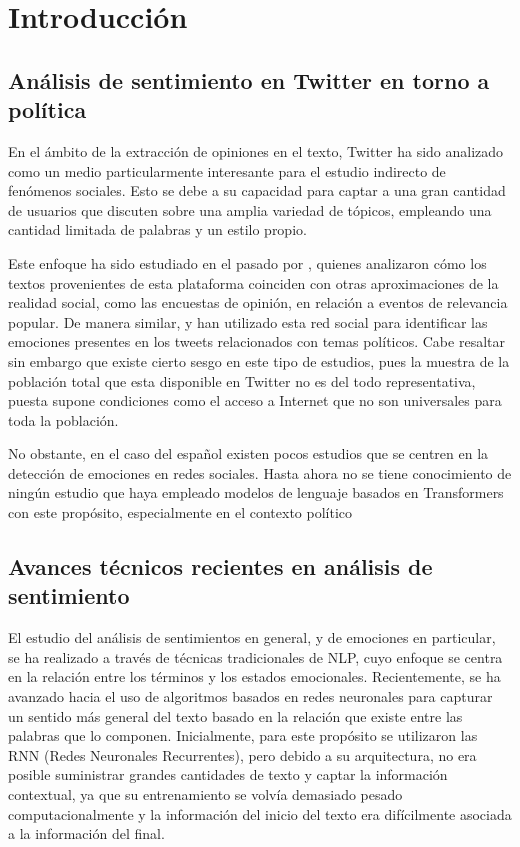 \chapter{Introducción}

\section{Análisis de sentimiento en Twitter en torno a política}


En el ámbito de la extracción de opiniones en el texto, Twitter ha sido analizado como un medio particularmente interesante para el estudio indirecto de fenómenos sociales. Esto se debe a su capacidad para captar a una gran cantidad de usuarios que discuten sobre una amplia variedad de tópicos, empleando una cantidad limitada de palabras y un estilo propio. 

Este enfoque ha sido estudiado en el pasado por \cite{o2010tweets}, quienes analizaron cómo los textos provenientes de esta plataforma coinciden con otras aproximaciones de la realidad social, como las encuestas de opinión, en relación a eventos de relevancia popular. De manera similar, \cite{tumasjan2010predicting} y \cite{mohammad2015sentiment} han utilizado esta red social para identificar las emociones presentes en los tweets relacionados con temas políticos. Cabe resaltar sin embargo que existe cierto sesgo en este tipo de estudios, pues la muestra de la población total que esta disponible en Twitter no es del todo representativa, puesta supone condiciones como el acceso a Internet que no son universales para toda la población.

No obstante, en el caso del español existen pocos estudios que se centren en la detección de emociones en redes sociales. Hasta ahora no se tiene conocimiento de ningún estudio que haya empleado modelos de lenguaje basados en Transformers con este propósito, especialmente en el contexto político 


\section{Avances técnicos recientes en análisis de sentimiento}

El estudio del análisis de sentimientos en general, y de emociones en particular, se ha realizado a través de técnicas tradicionales de NLP, cuyo enfoque se centra en la relación entre los términos y los estados emocionales. Recientemente, se ha avanzado hacia el uso de algoritmos basados en redes neuronales para capturar un sentido más general del texto basado en la relación que existe entre las palabras que lo componen. Inicialmente, para este propósito se utilizaron las RNN (Redes Neuronales Recurrentes), pero debido a su arquitectura, no era posible suministrar grandes cantidades de texto y captar la información contextual, ya que su entrenamiento se volvía demasiado pesado computacionalmente y la información del inicio del texto era difícilmente asociada a la información del final.

